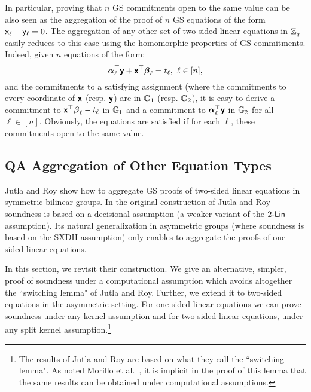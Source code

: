 In particular, proving that $n$ GS commitments open to the same value can be also seen as the aggregation of the proof  of $n$ GS equations of the form $\mathsf{x}_\ell -\mathsf{y}_\ell=0$. The aggregation of any other set of two-sided linear equations in $\mathbb{Z}_q$
easily reduces to this case using the homomorphic properties of GS commitments. Indeed, given $n$ equations of the form:
 $$  {\boldsymbol \alpha}_{\ell}^{\top} \textbf{\textsf{y}}+ \textbf{\textsf{x}}^{\top}\boldsymbol \beta_{\ell} =t_\ell, \ \ell \in [n],$$
 and the commitments to a satisfying assignment (where the commitments to every coordinate of $\textbf{\textsf{x}}$ (resp. $\textbf{\textsf{y}}$) are in $\mathbb{G}_1$ (resp. $\mathbb{G}_2$), it is easy to derive a commitment to $\textbf{\textsf{x}}^{\top} {\boldsymbol \beta}_{\ell}- t_{\ell}$ in $\mathbb{G}_1$ and a commitment to  ${\boldsymbol \alpha}_{\ell}^{\top} \textbf{\textsf{y}}$ in $\mathbb{G}_2$ for all $\ell \in [n]$. Obviously, the equations are satisfied if for each $\ell$, these commitments open to the same value. 


\subsection{QA Aggregation of Other Equation Types} \label{sec:jutroyaggasym}
Jutla and Roy \cite{C:JutRoy14} show how to aggregate GS proofs of 
two-sided linear equations in symmetric bilinear groups. In the original construction of Jutla and Roy soundness is based on a decisional assumption (a weaker variant of the $2\mbox{-}\mathsf{Lin}$ assumption). Its natural generalization in asymmetric groups (where soundness is based on the SXDH assumption) only enables to aggregate the proofs of one-sided linear equations. 

In this section, we revisit their construction. We give an alternative, simpler, proof of soundness under a computational assumption which avoids altogether the ``switching lemma" of Jutla and Roy. Further, we extend it to two-sided equations in the asymmetric setting. For one-sided linear equations we can prove soundness under any kernel assumption and for two-sided linear equations, under any split kernel assumption.\footnote{The results of Jutla and Roy are based on what they call  the ``switching lemma". As noted Morillo et al.~\cite{EPRINT:MorRafVil15}, it is implicit in the proof of this lemma that the same results can be obtained under computational assumptions.}

